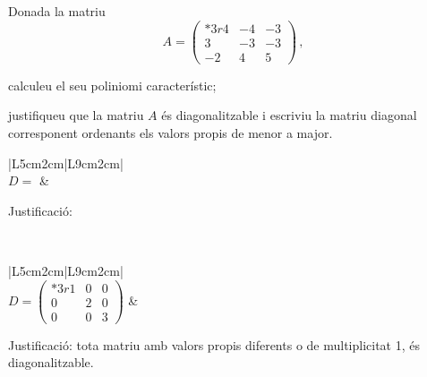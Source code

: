 \documentclass[10pt,catalan]{article}
\begin{document}
\begin{enunciat}
Donada la matriu
\[
   A=\begin{pmatrix}{*{3}r} 4 & -4 & -3\\ 3 & -3 & -3\\ -2 & 4 & 5\end{pmatrix}\,,
\]
\begin{apartats}
\item calculeu el seu poliniomi característic;
\item justifiqueu que la matriu $A$ és diagonalitzable i escriviu la matriu diagonal corresponent  ordenants els valors propis de menor a major.
\end{apartats}
\end{enunciat}

\begin{quadricula}
\begin{tabular}{|L{5cm}{2cm}|L{9cm}{2cm}|}
\hline
{} \\
\hline
$D=$ & \begin{minipage}[t]{8.8cm}Justificació:\vspace{1.8cm} \end{minipage}\\
\hline
\end{tabular}
\end{quadricula}

\begin{solucio}
\begin{center}
\begin{tabular}{|L{5cm}{2cm}|L{9cm}{2cm}|}
\hline
{} \\
\hline
$D=\begin{pmatrix}{*{3}r} 1 & 0 & 0\\ 0 & 2 & 0\\ 0 & 0 & 3\end{pmatrix}$ & 
\begin{minipage}[t]{8.8cm}
Justificació: tota matriu amb valors propis diferents o de multiplicitat 1, és diagonalitzable.
\vspace{1cm}
\end{minipage} \\
\hline
\end{tabular}
\end{center}
\end{solucio}
\end{document}
